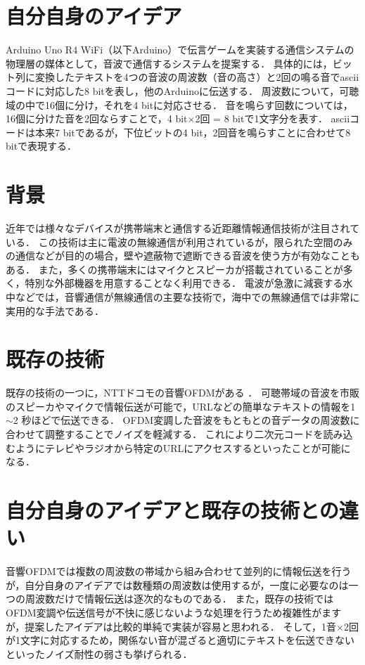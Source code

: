 \documentclass[a4paper,12pt,oneside]{jex}
\begin{document}
\thispagestyle{empty}
\setcounter{tocdepth}{3}

\section{自分自身のアイデア}
Arduino Uno R4 WiFi（以下Arduino）で伝言ゲームを実装する通信システムの物理層の媒体として，音波で通信するシステムを提案する．
具体的には，ビット列に変換したテキストを4つの音波の周波数（音の高さ）と2回の鳴る音でasciiコードに対応した8 bitを表し，他のArduinoに伝送する．
周波数について，可聴域の中で16個に分け，それを4 bitに対応させる．
音を鳴らす回数については，16個に分けた音を2回ならすことで，4 bit$\times$2回 = 8 bitで1文字分を表す．
asciiコードは本来7 bitであるが，下位ビットの4 bit，2回音を鳴らすことに合わせて8 bitで表現する．

\section{背景}
近年では様々なデバイスが携帯端末と通信する近距離情報通信技術が注目されている\cite{ref:sound_audible}．
この技術は主に電波の無線通信が利用されているが，限られた空間のみの通信などが目的の場合，壁や遮蔽物で遮断できる音波を使う方が有効なこともある．
また，多くの携帯端末にはマイクとスピーカが搭載されていることが多く，特別な外部機器を用意することなく利用できる．
電波が急激に減衰する水中などでは，音響通信が無線通信の主要な技術で，海中での無線通信では非常に実用的な手法である\cite{ref:sound_underwater}．

\section{既存の技術}
既存の技術の一つに，NTTドコモの音響OFDMがある\cite{ref:ofdm} \cite{ref:ofdm_docomo}．
可聴帯域の音波を市販のスピーカやマイクで情報伝送が可能で，URLなどの簡単なテキストの情報を1$\sim$2 秒ほどで伝送できる．
OFDM変調した音波をもともとの音データの周波数に合わせて調整することでノイズを軽減する．
これにより二次元コードを読み込むようにテレビやラジオから特定のURLにアクセスするといったことが可能になる．

\section{自分自身のアイデアと既存の技術との違い}
音響OFDMでは複数の周波数の帯域から組み合わせて並列的に情報伝送を行うが，自分自身のアイデアでは数種類の周波数は使用するが，一度に必要なのは一つの周波数だけで情報伝送は逐次的なものである．
また，既存の技術ではOFDM変調や伝送信号が不快に感じないような処理を行うため複雑性がますが，提案したアイデアは比較的単純で実装が容易と思われる．
そして，1音$\times$2回が1文字に対応するため，関係ない音が混ざると適切にテキストを伝送できないといったノイズ耐性の弱さも挙げられる．
\end{document}
